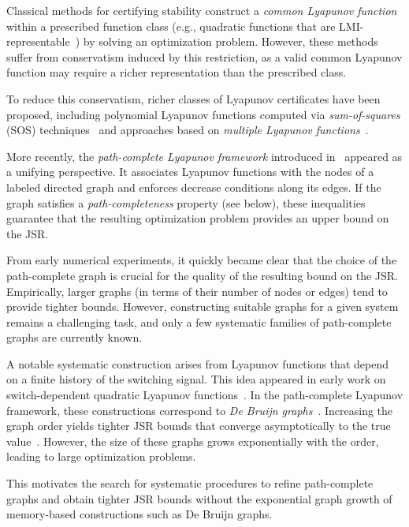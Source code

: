 \documentclass[letterpaper, 10 pt, conference]{ieeeconf}  %
\begin{document}
Classical methods for certifying stability construct a \emph{common Lyapunov function} within a prescribed function class (e.g., quadratic functions that are LMI-representable~\cite{boyd1994lmi}) by solving an optimization problem. However, these methods suffer from conservatism induced by this restriction, as a valid common Lyapunov function may require a richer representation than the prescribed class.

To reduce this conservatism, richer classes of Lyapunov certificates have been proposed, including polynomial Lyapunov functions computed via \emph{sum-of-squares} (SOS) techniques~\cite{parrilo2008approximation} and approaches based on \emph{multiple Lyapunov functions}~\cite{branicky1998multiple, lee2006uniform}.

More recently, the \emph{path-complete Lyapunov framework} introduced in~\cite{ahmadi2014joint} appeared as a unifying perspective. It associates Lyapunov functions with the nodes of a
labeled directed graph and enforces decrease conditions along its
edges. If the graph satisfies a \emph{path-completeness} property (see
 below), these inequalities guarantee that the resulting
optimization problem provides an upper bound on the JSR.

From early numerical experiments, it quickly became clear that the
choice of the path-complete graph is crucial for the quality of the
resulting bound on the JSR. Empirically, larger graphs (in terms
of their number of nodes or edges) tend to provide tighter bounds.
However, constructing suitable graphs for a given system remains a
challenging task, and only a few systematic families of path-complete
graphs are currently known.

A notable systematic construction arises from Lyapunov functions
that depend on a finite history of the switching signal. This idea
appeared in early work on switch-dependent quadratic Lyapunov
functions~\cite{bliman2003stability}. In the path-complete Lyapunov framework, these
constructions correspond to \emph{De Bruijn graphs}~\cite{de1948combinatorial}. Increasing the graph order yields tighter JSR bounds that converge asymptotically to the true value~\cite[Theorem~6.1]{ahmadi2014joint}. However, the
size of these graphs grows exponentially with the order, leading to
large optimization problems.

This motivates the search for systematic procedures to refine path-complete graphs and obtain tighter JSR bounds without the exponential graph growth of memory-based constructions such as De Bruijn graphs.
\end{document}
